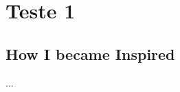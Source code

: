 \appendix


\renewcommand{\appendixtocname}{APÊNDICES}%
\noappendicestocpagenum %
\addappheadtotoc %
\renewcommand{\appendixname}{APÊNDICES}%
\renewcommand{\appendixpagename}{APÊNDICES}%
	
\chapter{Teste 1}	
	
	\begin{subappendices}
		\section{How I became Inspired}
		...
	\end{subappendices}
